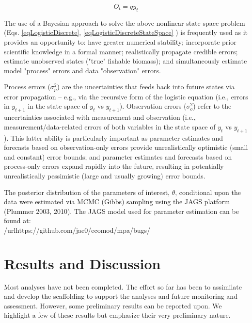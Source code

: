 \documentclass[letterpaper,portrait,11pt]{scrartcl}
\numberwithin{equation}{section}		%
\numberwithin{figure}{section}		%
\numberwithin{table}{section}				%
\begin{document}
\begin{equation} 
\label{eqLogisticDiscreteStateSpace}
O_t = q y_t
\end{equation}


The use of a Bayesian approach to solve the above nonlinear state space problem (Eqs. \ref{eqLogisticDiscrete}, \ref{eqLogisticDiscreteStateSpace} ) is frequently used as it provides an opportunity to: have greater numerical stability;  incorporate prior scientific knowledge in a formal manner; realistically propagate credible errors; estimate unobserved states ("true" fishable biomass); and simultaneously estimate model "process" errors and data "observation" errors. 

Process errors ($\sigma^2_p$) are the uncertainties that feeds back into future states via error propagation -- e.g., via the recursive form of the logistic equation (i.e., errors in $y_{t+1}$ in the state space of $y_t$ vs $y_{t+1}$). Observation errors ($\sigma^2_o$) refer to the uncertainties associated with measurement and observation (i.e., measurement/data-related errors of both variables in the state space of $y_t$ vs $y_{t+1}$). This latter ability is particularly important as parameter estimates and forecasts based on observation-only errors provide unrealistically optimistic (small and constant) error bounds; and parameter estimates and forecasts based on process-only errors expand rapidly into the future, resulting in potentially unrealistically pessimistic (large and usually growing) error bounds.

The posterior distribution of the parameters of interest, $\theta$, conditional upon the data were estimated via MCMC (Gibbs) sampling using the JAGS platform (Plummer 2003, 2010). The JAGS model used for parameter estimation can be found at: \\

/url{https://github.com/jae0/ecomod/mpa/bugs/}



\section{Results and Discussion}

Most analyses have not been completed. The effort so far has been to assimilate and develop the scaffolding to support the analyses and future monitoring and assessment. However, some preliminary results can be reported upon. We highlight a few of these results but emphasize their very preliminary nature. 
\end{document}
